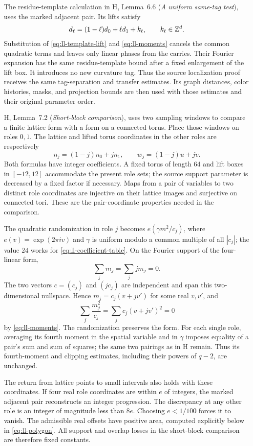 The residue-template calculation in H, Lemma~6.6
(\emph{A uniform same-tag test}), uses the
marked adjacent pair.  Its lifts satisfy
\begin{equation}
 d_\ell=(1-\ell)d_0+\ell d_1+k_\ell,
 \qquad k_\ell\in\mathbb Z^d.
 \label{eq:ll-template-lift}
\end{equation}
Substitution of \eqref{eq:ll-template-lift} and
\eqref{eq:ll-moments} cancels the common quadratic terms and leaves
only linear phases from the carries.  Their Fourier expansion has
the same residue-template bound after a fixed enlargement of the
lift box.  It introduces no new curvature tag.  Thus the source
localization proof receives the same tag-separation and transfer
estimates.  Its graph distances, color histories, masks, and
projection bounds are then used with those estimates and their
original parameter order.

H, Lemma~7.2 (\emph{Short-block comparison}), uses two sampling
windows to compare a finite lattice form with a form on a connected
torus.  Place those windows on roles $0,1$.  The lattice and lifted
torus coordinates in the other roles are respectively
\[
 n_j=(1-j)n_0+jn_1,
 \qquad w_j=(1-j)u+jv.
\]
Both formulas have integer coefficients.  A fixed torus of length
$64$ and lift boxes in $[-12,12]$ accommodate the present role sets;
the source support parameter is decreased by a fixed factor if
necessary.  Maps from a pair of variables to two distinct role
coordinates are injective on their lattice images and surjective on
connected tori.  These are the pair-coordinate properties needed in
the comparison.

The quadratic randomization in role $j$ becomes
$e(\gamma m^2/c_j)$, where $e(v)=\exp(2\pi i v)$ and $\gamma$ is
uniform modulo a common multiple of all $|c_j|$; the value $24$ works
for \eqref{eq:ll-coefficient-table}.  On the Fourier support of the
four-linear form,
\[
 \sum_jm_j=\sum_jjm_j=0.
\]
The two vectors $c=(c_j)$ and $(jc_j)$ are independent and span this
two-dimensional nullspace.  Hence $m_j=c_j(v+jv')$ for some real
$v,v'$, and
\[
 \sum_j\frac{m_j^2}{c_j}
 =\sum_jc_j(v+jv')^2=0
\]
by \eqref{eq:ll-moments}.  The randomization preserves the form.
For each single role, averaging its fourth moment in the spatial
variable and in $\gamma$ imposes equality of a pair's sum and sum of
squares; the same two pairings as in H remain.  Thus its fourth-moment
and clipping estimates, including their powers of $q-2$, are
unchanged.

The return from lattice points to small intervals also holds with
these coordinates.  If four real role coordinates are within $e$ of
integers, the marked adjacent pair reconstructs an integer progression.
The discrepancy at any other role is an integer of magnitude less
than $8e$.  Choosing $e<1/100$ forces it to vanish.  The admissible
real offsets have positive area, computed explicitly below in
\eqref{eq:ll-polygon}.  All support and overlap losses in the
short-block comparison are therefore fixed constants.

